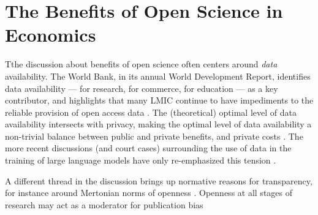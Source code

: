 \documentclass{article}
\begin{document}
%

\section{The Benefits of Open Science in Economics}
\label{sec:benefits}

Tthe discussion about benefits of open science often centers around \textit{data} availability. The World Bank, in its annual World Development Report, identifies data availability --- for research, for commerce, for education --- as a key contributor, and highlights that many LMIC continue to have impediments to the reliable provision of open access data \citep[, pg. 62]{world_bank_world_2021}. The (theoretical) optimal level of data availability intersects with privacy, making the optimal level of data availability a non-trivial balance between public and private benefits, and private costs \citep{duch-brown_economics_2017,acquisti_economics_2016,abowd_suboptimal_2019,abowd_economic_2018}. The more recent discussions (and court cases) surrounding the use of data in the training of large language models have only re-emphasized this tension \citep{panettieri_generative_2025}.

A different thread in the discussion brings up normative reasons for transparency, for instance around Mertonian \citep{merton1942note} norms of openness \citep[see ][for an overview]{miguel_evidence_2021}. Openness at all stages of research may act as a moderator for publication bias \citep{miguel_evidence_2021,brodeur_star_2016}
\end{document}
